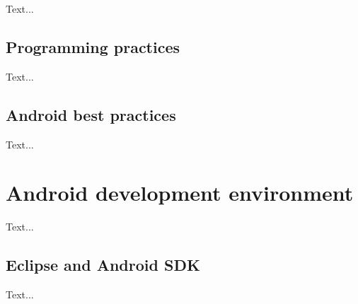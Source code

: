 Text...

\subsection{Programming practices}

Text...

\subsection{Android best practices}

Text...
\section{Android development environment}

Text...

\subsection{Eclipse and Android SDK}

Text...